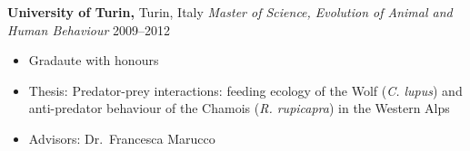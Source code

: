 
\vspace{5pt}

\textbf{University of Turin,} Turin, Italy \newline
\emph{Master of Science, Evolution of Animal and Human Behaviour} \hfill{2009--2012}
\begin{itemize}
  \item Gradaute with honours
  \item Thesis: Predator-prey interactions: feeding ecology of the Wolf (\textit{C. lupus}) and anti-predator behaviour of the Chamois (\textit{R. rupicapra}) in the Western Alps
  \item Advisors: Dr.~Francesca Marucco
\end{itemize}
